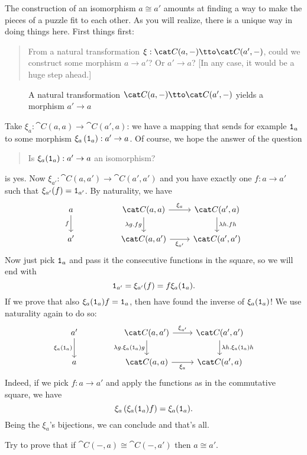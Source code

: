 The construction of an isomorphism \(a \cong a'\) amounts at finding a way to make the pieces of a puzzle fit to each other. As you will realize, there is a unique way in doing things here. First things first:
%
\begin{quotation}
From a natural transformation \(\xi : \cat C(a, -) \tto \cat C(a', -)\), could we construct some morphism \(a \to a'\)? Or \(a' \to a\)? [In any case, it would be a huge step ahead.]
\end{quotation}
%
\begin{figure}
\centering

\caption{A natural transformation \(\cat C(a, -) \tto \cat C(a', -)\) yields a morphism \(a' \to a\)}
\end{figure}
%
Take \(\xi_a : \cat C (a, a) \to \cat C(a', a)\): we have a mapping that sends for example \(\mathtt 1_a\) to some morphism \(\xi_a \left(\mathtt 1_a\right) : a' \to a\). Of course, we hope the answer of the question
%
\begin{quotation}
Is \(\xi_a(\mathtt 1_a) : a' \to a\) an isomorphism?
\end{quotation}
is yes. Now \(\xi_{a'} : \cat C(a, a') \to \cat C(a', a')\) and you have exactly one \(f : a \to a'\) such that \(\xi_{a'}(f) = \mathtt 1_{a'}\). By naturality, we have
%
\[\begin{tikzcd}
a \ar["f", d, swap] & & \cat C (a, a) \ar["{\lambda g . fg}", d, swap] \ar["{\xi_a}", r] & \cat C(a', a) \ar["{\lambda h . fh}", d] \\
a' & & \cat C(a, a') \ar["{\xi_{a'}}", r, swap] & \cat C(a', a')
\end{tikzcd}\]
%
Now just pick \(\mathtt 1_a\) and pass it the consecutive functions in the square, so we will end with
\[\mathtt 1_{a'} = \xi_{a'} (f) = f \xi_{a}(\mathtt 1_a) .\]
If we prove that also \(\xi_{a}(\mathtt 1_a) f = \mathtt 1_a\), then have found the inverse of \(\xi_a(\mathtt 1_a)\)! We use naturality again to do so:
%
\[\begin{tikzcd}
a' \ar["{\xi_a(\id_a)}", d, swap] & & \cat C (a, a') \ar["{\lambda g . \xi_a(\id_a) g}", d, swap] \ar["{\xi_{a'}}", r] & \cat C(a', a') \ar["{\lambda h . \xi_{a} (\id_a)} h", d] \\
a & & \cat C(a, a) \ar["{\xi_a}", r, swap] & \cat C(a', a)
\end{tikzcd}\]
%
Indeed, if we pick \(f : a \to a'\) and apply the functions as in the commutative square, we have
%
\[\xi_a \left( \xi_a(\mathtt 1_a) f \right) = \xi_a(\mathtt 1_a) .\]
%
Being the \(\xi_a\)'s bijections, we can conclude and that's all.

\begin{exercise}
Try to prove that if \(\cat C(-, a) \cong \cat C(-, a')\) then \(a \cong a'\).
\end{exercise}

